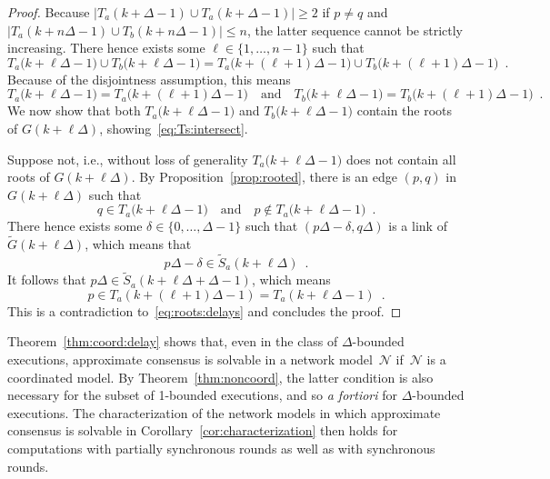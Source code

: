 \documentclass[a4paper]{article}
\theoremstyle{newthm}
\renewcommand{\leq}{\leqslant}
\renewcommand{\geq}{\geqslant}
\begin{document}
\begin{proof}
Because $\lvert T_{a}(k+\Delta-1)
\cup
T_{a}(k+\Delta-1)\rvert\geq 2$ if $p\neq q$ and
$\lvert T_{a}(k + n\Delta - 1)
\cup
T_{b}(k + n\Delta - 1)\rvert \leq n$, the latter sequence cannot be strictly
increasing.
There hence exists some $\ell\in\{1,\dots,n-1\}$ such that
\begin{equation*}
T_{a}\big(k + \ell \Delta - 1\big) 
\cup
T_{b}\big(k + \ell \Delta - 1\big) 
=
T_{a}\big(k + (\ell+1) \Delta - 1\big) 
\cup
T_{b}\big(k + (\ell+1) \Delta - 1\big) 
\enspace.
\end{equation*}
Because of the disjointness assumption, this means 
\begin{equation*}
T_{a}\big(k + \ell \Delta - 1\big) 
=
T_{a}\big(k + (\ell+1) \Delta - 1\big) 
\quad\text{and}\quad
T_{b}\big(k + \ell \Delta - 1\big) 
=
T_{b}\big(k + (\ell+1) \Delta - 1\big) 
\enspace.
\end{equation*}
We now show that both 
$T_{a}\big(k + \ell \Delta - 1\big)$ and $T_{b}\big(k + \ell
\Delta - 1\big)$ contain the roots of $G(k+\ell\Delta)$,
showing~\eqref{eq:Ts:intersect}.

Suppose not, i.e., without loss of generality $T_{a}\big(k + \ell
\Delta - 1\big)$ does not contain all roots of $G(k+\ell\Delta)$.
By Proposition~\ref{prop:rooted}, there is an edge $(p,q)$ in
$G(k+\ell\Delta)$ such that
\begin{equation}\label{eq:roots:delays}
q\in T_{a}\big(k + \ell
\Delta - 1\big)
\quad\text{and}\quad
p\not\in T_{a}\big(k + \ell
\Delta - 1\big)
\enspace.
\end{equation}
There hence exists some $\delta\in\{0,\dots,\Delta-1\}$ such that
$(p\Delta-\delta,q\Delta)$ is a link  of $\tilde{G}(k+\ell\Delta)$, which
means that
\begin{equation*}
p\Delta-\delta \in \tilde{S}_{a}(k+\ell\Delta)
\enspace.
\end{equation*}
It follows that $p\Delta\in \tilde{S}_{
a}(k+\ell\Delta+\Delta-1)$, which means
\begin{equation*}
p\in T_{a}(k + (\ell+1)\Delta-1) = T_{a}(k + \ell\Delta-1)
\enspace.
\end{equation*}
This is a contradiction to~\eqref{eq:roots:delays} and concludes the proof.
\end{proof}


Theorem~\ref{thm:coord:delay} shows that, even in the class of $\Delta$-bounded
	executions, approximate consensus is solvable in a network model~$\mathcal{N}$
	if~$\mathcal{N}$ is a coordinated model.
By Theorem~\ref{thm:noncoord}, the latter condition is also necessary for the subset of 
	1-bounded executions, and so {\it a fortiori} for $\Delta$-bounded executions.
The characterization of the network models in which approximate consensus is solvable 
	in Corollary~\ref{cor:characterization} then holds for computations with
	partially synchronous rounds as well as with  synchronous rounds.  
\end{document}
